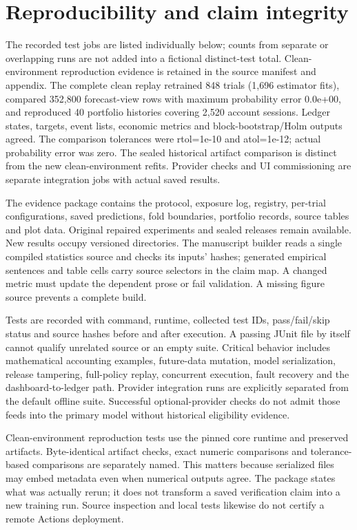 \section{Reproducibility and claim integrity}\label{sec:section-10}

The recorded test jobs are listed individually below; counts from separate or overlapping runs are not added into a fictional distinct-test total. Clean-environment reproduction evidence is retained in the source manifest and appendix. The complete clean replay retrained 848 trials (1,696 estimator fits), compared 352,800 forecast-view rows with maximum probability error 0.0e+00, and reproduced 40 portfolio histories covering 2,520 account sessions. Ledger states, targets, event lists, economic metrics and block-bootstrap/Holm outputs agreed. The comparison tolerances were rtol=1e-10 and atol=1e-12; actual probability error was zero. The sealed historical artifact comparison is distinct from the new clean-environment refits. Provider checks and UI commissioning are separate integration jobs with actual saved results.

The evidence package contains the protocol, exposure log, registry, per-trial configurations, saved predictions, fold boundaries, portfolio records, source tables and plot data. Original repaired experiments and sealed releases remain available. New results occupy versioned directories. The manuscript builder reads a single compiled statistics source and checks its inputs' hashes; generated empirical sentences and table cells carry source selectors in the claim map. A changed metric must update the dependent prose or fail validation. A missing figure source prevents a complete build.

Tests are recorded with command, runtime, collected test IDs, pass/fail/skip status and source hashes before and after execution. A passing JUnit file by itself cannot qualify unrelated source or an empty suite. Critical behavior includes mathematical accounting examples, future-data mutation, model serialization, release tampering, full-policy replay, concurrent execution, fault recovery and the dashboard-to-ledger path. Provider integration runs are explicitly separated from the default offline suite. Successful optional-provider checks do not admit those feeds into the primary model without historical eligibility evidence.

Clean-environment reproduction tests use the pinned core runtime and preserved artifacts. Byte-identical artifact checks, exact numeric comparisons and tolerance-based comparisons are separately named. This matters because serialized files may embed metadata even when numerical outputs agree. The package states what was actually rerun; it does not transform a saved verification claim into a new training run. Source inspection and local tests likewise do not certify a remote Actions deployment.
